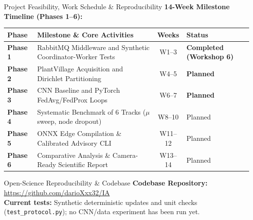 \documentclass[aspectratio=169]{beamer}
\begin{document}
\begin{frame}{Project Feasibility, Work Schedule \& Reproducibility}
    \textbf{14-Week Milestone Timeline (Phases 1--6):}
    \vspace{0.05cm}
    \begin{center}
    \tiny
    \renewcommand{\arraystretch}{1.15}
    \begin{tabular}{@{} l p{5.5cm} c l @{}}
        \toprule
        \textbf{Phase} & \textbf{Milestone \& Core Activities} & \textbf{Weeks} & \textbf{Status} \\
        \midrule
        \textbf{Phase 1} & RabbitMQ Middleware and Synthetic Coordinator-Worker Tests & W1--3 & \textbf{Completed (Workshop 6)} \\
        \textbf{Phase 2} & PlantVillage Acquisition and Dirichlet Partitioning & W4--5 & \textbf{Planned} \\
        \textbf{Phase 3} & CNN Baseline and PyTorch FedAvg/FedProx Loops & W6--7 & \textbf{Planned} \\
        \textbf{Phase 4} & Systematic Benchmark of 6 Tracks ($\mu$ sweep, node dropout) & W8--10 & Planned \\
        \textbf{Phase 5} & ONNX Edge Compilation \& Calibrated Advisory CLI & W11--12 & Planned \\
        \textbf{Phase 6} & Comparative Analysis \& Camera-Ready Scientific Report & W13--14 & Planned \\
        \bottomrule
    \end{tabular}
    \end{center}
    \vspace{0.08cm}
    \begin{block}{Open-Science Reproducibility \& Codebase}
        \scriptsize
        \textbf{Codebase Repository:} \url{https://github.com/darioXxx32/IA}\\
        \textbf{Current tests:} Synthetic deterministic updates and unit checks (\texttt{test\_protocol.py}); no CNN/data experiment has been run yet.
    \end{block}
\end{frame}
\end{document}

